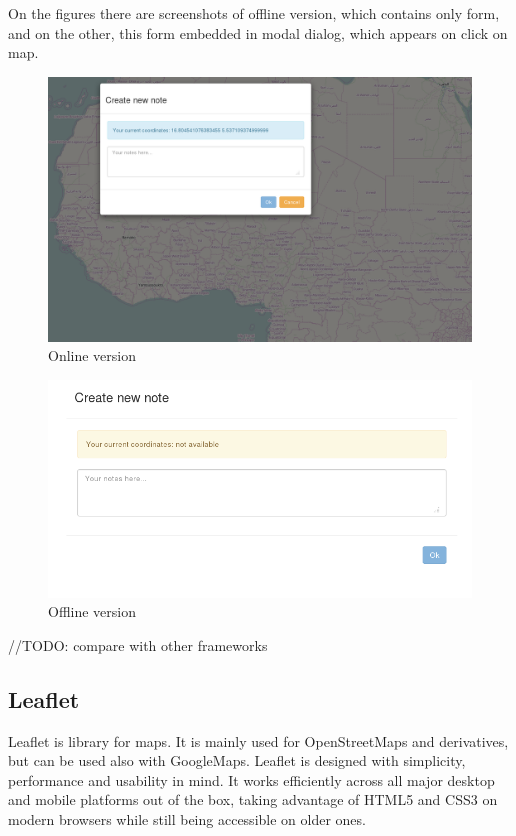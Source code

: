 \documentclass[12pt,a4paper]{article}
\begin{document}
On the figures there are screenshots of offline version, which contains only form,
and on the other, this form embedded in modal dialog, which appears on click on map.

    \begin{figure}[h]
      \begin{center}
        \includegraphics[width=\textwidth]{res/online}
      \end{center}
      \caption{Online version}
    \end{figure}

    \begin{figure}[h]
      \begin{center}
        \includegraphics[width=\textwidth]{res/offline}
      \end{center}
      \caption{Offline version}
    \end{figure}

//TODO: compare with other frameworks

\subsection{Leaflet}
Leaflet is library for maps. It is mainly used for OpenStreetMaps and derivatives,
but can be used also with GoogleMaps.
Leaflet is designed with simplicity, performance and usability in mind.
It works efficiently across all major desktop and mobile platforms out of the box,
taking advantage of HTML5 and CSS3 on modern browsers while still being accessible on older ones.
\end{document}
